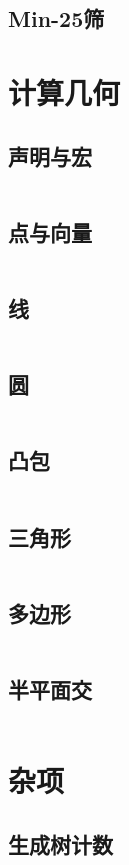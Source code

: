 \documentclass[12pt, a4paper, oneside]{ctexart}
\begin{document}
\begin{multicols}{2}
        \subsection{Min-25筛}
        

        \section{计算几何}
        \subsection{声明与宏}
        \inputminted{cpp}{src/geometry/define.cpp}
        \subsection{点与向量}
        \inputminted{cpp}{src/geometry/vector.cpp}
        \subsection{线}
        \inputminted{cpp}{src/geometry/line.cpp}
        \subsection{圆}
        \inputminted{cpp}{src/geometry/circle.cpp}
        \subsection{凸包}
        \inputminted{cpp}{src/geometry/convex.cpp}
        \subsection{三角形}
        \inputminted{cpp}{src/geometry/triangle.cpp}
        \subsection{多边形}
        \inputminted{cpp}{src/geometry/polygon.cpp}
        \subsection{半平面交}
        \inputminted{cpp}{src/geometry/half-plane.cpp}

        \section{杂项}
        \subsection{生成树计数}
        

\end{multicols}
\end{document}
